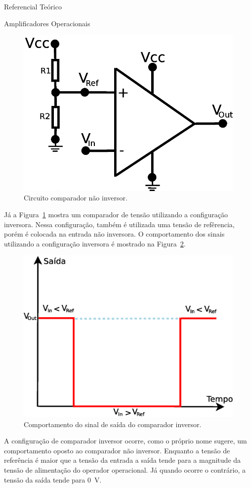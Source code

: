 \begin{chapter}{Referencial Teórico}
\begin{section}{Amplificadores Operacionais}
\begin{figure}[!h]
	\centering
	\begin{minipage}[c]{\textwidth}
	\centering
	\includegraphics[width=0.5\linewidth]{fig/inversor}
	\caption{Circuito comparador não inversor.}
	\label{fig:comparador2}
	\end{minipage}
\end{figure}

Já a Figura~\ref{fig:comparador2} mostra um comparador de tensão utilizando a
configuração inversora. Nessa configuração, também é utilizada uma tensão de
refêrencia, porém é colocada na entrada não inversora. O comportamento dos sinais
utilizando a configuração inversora é mostrado na Figura~\ref{fig:sinal2}. 


\begin{figure}[!h]
	\centering
	\begin{minipage}[c]{\textwidth}
	\centering
	\includegraphics[width=0.5\linewidth]{fig/comparador_inversor}
	\caption{Comportamento do sinal de saída do comparador inversor.}
	\label{fig:sinal2}
	\end{minipage}
\end{figure}

A configuração de comparador inversor ocorre, como o próprio nome sugere, um
comportamento oposto ao comparador não inversor. Enquanto a tensão de referência
é maior que a tensão da entrada a saída tende para a magnitude da tensão de
alimentação do operador operacional. Já quando ocorre o contrário,  a tensão da
saída tende para 0~V.


\end{section}
\end{chapter}
